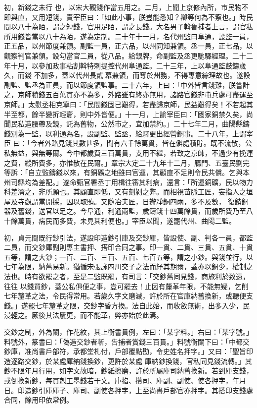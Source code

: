 \begin{pinyinscope}
 初，新錢之未行
 也，以宋大觀錢作當五用之。二月，上聞上京修內所，市民物不即與直，又用短錢，責宰臣曰：「如此小事，朕豈能悉知？卿等何為不察也。」時民間以八十為陌，謂之短錢，官用足陌，謂之長錢。大名男子斡魯補者上言，謂官私所用錢皆當以八十為陌，遂為定制。二十年十一月，名代州監曰阜通，設監一員，正五品，以州節度兼領。副監一員，正六品，以州同知兼領。丞一員，正七品，以觀察判官兼領。設勾當官二員，從八品。給銀牌，命副監及丞更馳驛經理。二十二年十月，以參加政事粘割斡特剌提控代州阜通監。二十三年，上以阜通監鼓鑄歲久，而錢
 不加多，蓋以代州長貳幕兼領，而奪於州務，不得專意綜理故也。遂設副監、監丞為正員，而以節度領監事。二十六年，上曰：「中外皆言錢難，朕嘗計之，京師積錢五百萬貫亦不為多，外路雖有終亦無用，諸路官錢非屯兵處可盡運至京師。」太慰丞相克寧曰：「民間錢固已艱得，若盡歸京師，民益艱得矣！不若起其半至都，餘半變折輕齎，則中外皆便。」十一月，上諭宰臣曰：「國家銅禁久矣，尚聞民私造腰帶及鏡，託為舊物，公然市之，宜加禁約。」二十七年二月，曲陽縣鑄錢別為一監，以利通為名，設副監、監丞，給驛更出經營銅事。二十八年，上謂宰臣
 曰：「今者外路見錢其數甚多，聞有六千餘萬貫，皆在僻處積貯。既不流散，公私無益，與無等爾。今中都歲費三百萬貫，支用不繼，若致之京師，不過少有挽運之費，縱所費多，亦惟散在民爾。」章宗大定二十九年十二月，鴈門、五臺民劉完等訴：「自立監鑄錢以來，有銅礦之地雖曰官運，其顧直不足則令民共償。乞與本州司縣均為差配。」遂命甄官署丞丁用楫往審其利病，還言：「所運銅礦，民以物力科差濟之，非所願也。其顧直即低，又有刻剝之弊。而相視苗脈工匠，妄指人之垣屋及寺觀謂當開採，因以取賄。又隨冶夫匠，日辦凈銅四兩，多不及數，
 復銷銅器及舊錢，送官以足之。今阜通，利通兩監，歲鑄錢十四萬餘貫，而歲所費乃至八十餘萬貫，病民而多費，未見其利便也。」宰臣以聞，遂罷代州、曲陽二監。



 初，貞元間既行鈔引法，遂設印造鈔引庫及交鈔庫，皆設使、副、判各一員，都監二員，而交鈔庫副則專主書押、搭印合同之事。印一貫、二貫、三貫、五貫、十貫五等，謂之大鈔；一百、二百、三百、五百、七百五等，謂之小鈔。與錢並行，以七年為限，納舊易新。猶循宋張詠四川交子之法而紓其期爾，蓋亦以銅少，權制之法也。時有欲罷之者，至是二監既罷，有司言：「交鈔舊同見錢，商旅利於致遠，往往
 以錢買鈔，蓋公私俱便之事，豈可罷去！止因有釐革年限，不能無疑，乞削七年釐革之法，令民得常用。若歲久字文磨滅，許於所在官庫納舊換新，或聽便支錢。」遂罷七年釐革之限，交鈔字昏方換。法自此始，而收斂無術，出多入少，民浸輕之。厥後其法屢更，而不能革，弊亦始於此焉。



 交鈔之制，外為闌，作花紋，其上衡書貫例，左曰：「某字料。」右曰：「某字號。」料號外，篆書曰：「偽造交鈔者斬，告捕者賞錢三百貫。」料號衡闌下曰：「中都交鈔庫，准尚書戶部符，承都堂札付，戶部覆點勘，令史姓名押字。」又曰：「聖旨印造逐路交鈔，於某處庫納錢換鈔，更許於某處
 庫納鈔換錢，官私同見錢流轉。」其鈔不限年月行用，如字文故暗，鈔紙擦磨，許於所屬庫司納舊換新。若到庫支錢，或倒換新鈔，每貫剋工墨錢若干文。庫掐、攢司、庫副、副使、使各押字，年月日。印造鈔引庫庫子、庫司、副使各押字，上至尚書戶部官亦押字。其搭印支錢處合同，餘用印依常例。



\end{pinyinscope}
